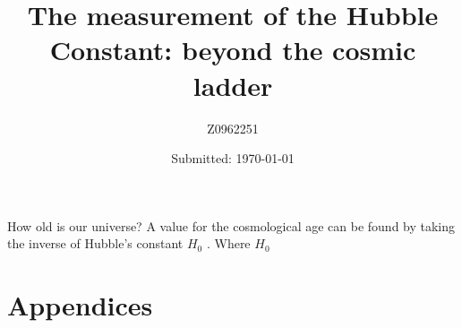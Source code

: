 \documentclass[12pt, onecolumn]{revtex4}    %
\begin{document}
                     


\title{The measurement of the Hubble Constant: beyond the cosmic ladder} 
\date{Submitted: \today{}}
\author{Z0962251}

\maketitle
\thispagestyle{plain} %

How old is our universe? A value for the cosmological age can be found by taking the inverse of Hubble's constant $H_0$ \cite{carroll_astro}. Where $H_0$  

\newpage




\newpage

\section*{Appendices}
\end{document}
